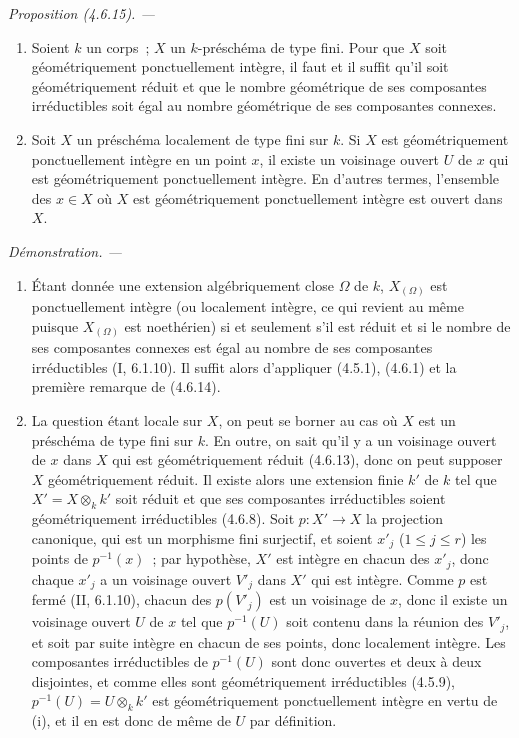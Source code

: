 \documentclass[10pt,oneside]{book}
\newenvironment{proposition}[1][]{%
  \par\medskip\noindent\itshape Proposition (#1). ---\ }{\par}
\newenvironment{proof}{%
  \par\medskip\noindent\textit{Démonstration. ---\ }}{\par}
\begin{document}
\begin{proposition}[4.6.15]
\label{IV.2.4.6.15-fr}
\begin{enumerate}
\item[(i)] Soient $k$ un corps~; $X$ un $k$-préschéma de type fini. Pour que $X$
soit géométriquement ponctuellement intègre, il faut et il suffit qu'il soit
géométriquement réduit et que le nombre géométrique de ses composantes
irréductibles soit égal au nombre géométrique de ses composantes connexes.
\item[(ii)] Soit $X$ un préschéma localement de type fini sur $k$. Si $X$ est
géométriquement ponctuellement intègre en un point $x$, il existe un voisinage
ouvert $U$ de $x$ qui est géométriquement ponctuellement intègre. En d'autres
termes, l'ensemble des $x\in X$ où $X$ est géométriquement ponctuellement
intègre est ouvert dans $X$.
\end{enumerate}
\end{proposition}

\begin{proof}
\begin{enumerate}
\item[(i)] Étant donnée une extension algébriquement close $\Omega$ de $k$,
$X_{(\Omega)}$ est ponctuellement intègre (ou localement intègre, ce qui
revient au même puisque $X_{(\Omega)}$ est noethérien) si et seulement s'il est
réduit et si le nombre de ses composantes connexes est égal au nombre de ses
composantes irréductibles (I, 6.1.10). Il suffit alors d'appliquer (4.5.1),
(4.6.1) et la première remarque de (4.6.14).

\item[(ii)] La question étant locale sur $X$, on peut se borner au cas où $X$
est un préschéma de type fini sur $k$. En outre, on sait qu'il y a un voisinage
ouvert de $x$ dans $X$ qui est géométriquement réduit (4.6.13), donc on peut
supposer $X$ géométriquement réduit. Il existe alors une extension finie $k'$
de $k$ tel que $X'=X\otimes_k k'$ soit réduit et que ses composantes
irréductibles soient géométriquement irréductibles (4.6.8). Soit
$p:X'\to X$ la projection canonique, qui est un morphisme fini surjectif, et
soient $x'_j$ ($1\leqslant j\leqslant r$) les points de $p^{-1}(x)$~; par
hypothèse, $X'$ est intègre en chacun des $x'_j$, donc chaque $x'_j$ a un
voisinage ouvert $V'_j$ dans $X'$ qui est intègre. Comme $p$ est fermé
(II, 6.1.10), chacun des $p(V'_j)$ est un voisinage de $x$, donc il existe un
voisinage ouvert $U$ de $x$ tel que $p^{-1}(U)$ soit contenu dans la réunion
des $V'_j$, et soit par suite intègre en chacun de ses points, donc localement
intègre. Les composantes irréductibles de $p^{-1}(U)$ sont donc ouvertes et
deux à deux disjointes, et comme elles sont géométriquement irréductibles
(4.5.9), $p^{-1}(U)=U\otimes_k k'$ est géométriquement ponctuellement intègre
en vertu de (i), et il en est donc de même de $U$ par définition.
\end{enumerate}
\end{proof}
\end{document}
